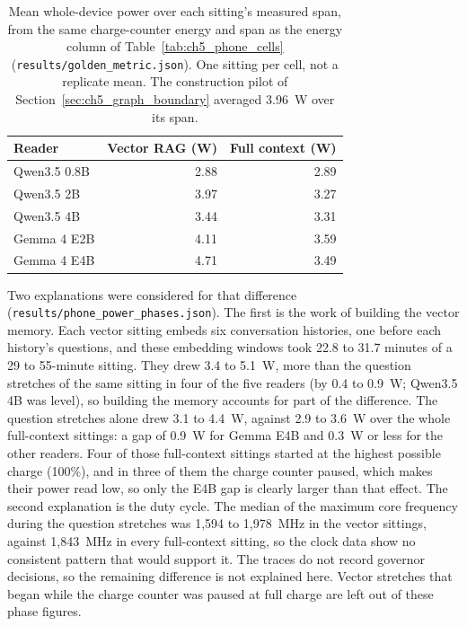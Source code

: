 \begin{table}[htbp]
  \centering
  \small
  \begin{tabular}{lrr}
    \toprule
    Reader & Vector RAG (W) & Full context (W) \\
    \midrule
    Qwen3.5 0.8B & 2.88 & 2.89 \\
    Qwen3.5 2B   & 3.97 & 3.27 \\
    Qwen3.5 4B   & 3.44 & 3.31 \\
    Gemma 4 E2B  & 4.11 & 3.59 \\
    Gemma 4 E4B  & 4.71 & 3.49 \\
    \bottomrule
  \end{tabular}
  \caption{Mean whole-device power over each sitting's measured span, from the same charge-counter
  energy and span as the energy column of Table~\ref{tab:ch5_phone_cells}
  (\texttt{results/golden\_metric.json}). One sitting per cell, not a replicate mean. The
  construction pilot of Section~\ref{sec:ch5_graph_boundary} averaged 3.96~W over its span.}
  \label{tab:ch5_power}
\end{table}

Two explanations were considered for that difference (\texttt{results/phone\_power\_phases.json}).
The first is the work of building the vector memory. Each vector sitting embeds six conversation
histories, one before each history's questions, and these embedding windows took 22.8 to 31.7 minutes
of a 29 to 55-minute sitting. They drew 3.4 to 5.1~W, more than the question stretches of the same
sitting in four of the five readers (by 0.4 to 0.9~W; Qwen3.5 4B was level), so building the memory
accounts for part of the difference. The question stretches alone drew 3.1 to 4.4~W, against 2.9 to
3.6~W over the whole full-context sittings: a gap of 0.9~W for Gemma E4B and 0.3~W or less for the
other readers. Four of those full-context sittings started at the highest possible charge (100\%),
and in three of them the charge counter paused, which makes their power read low, so only the E4B
gap is clearly larger than that effect. The second explanation is the duty cycle. The median of the maximum core frequency
during the question stretches was 1,594 to 1,978~MHz in the vector sittings, against 1,843~MHz in
every full-context sitting, so the clock data show no consistent pattern that would support it. The
traces do not record governor decisions, so the remaining difference is not explained here. Vector
stretches that began while the charge counter was paused at full charge are left out of these phase
figures.


